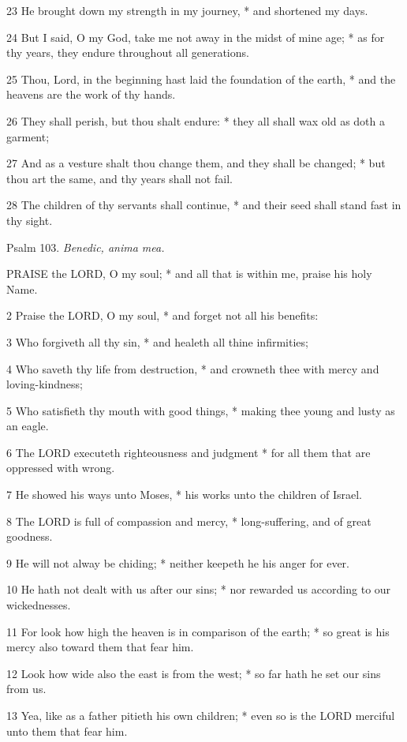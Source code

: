 23 He brought down my strength in my journey, * and
shortened my days.

24 But I said, O my God, take me not away in the midst
of mine age; * as for thy years, they endure throughout all generations.

25 Thou, Lord, in the beginning hast laid the foundation
of the earth, * and the heavens are the work of thy hands.

26 They shall perish, but thou shalt endure: * they
all shall wax old as doth a garment;

27 And as a vesture shalt thou change them, and they
shall be changed; * but thou art the same, and thy years shall not fail.

28 The children of thy servants shall continue, * and
their seed shall stand fast in thy sight.

Psalm
103. \emph{Benedic, anima mea.}

PRAISE
the LORD, O my soul; * and all that is within me, praise his holy Name.

2 Praise the LORD, O my soul, * and forget not all
his benefits:

3 Who forgiveth all thy sin, * and healeth all thine
infirmities;

4 Who saveth thy life from destruction, * and crowneth
thee with mercy and loving-kindness;

5 Who satisfieth thy mouth with good things, * making
thee young and lusty as an eagle.

6 The LORD executeth righteousness and judgment * for
all them that are oppressed with wrong.

7 He showed his ways unto Moses, * his works unto the
children of Israel.

8 The LORD is full of compassion and mercy, * long-suffering,
and of great goodness.

9 He will not alway be chiding; * neither keepeth he
his anger for ever.

10 He hath not dealt with us after our sins; * nor
rewarded us according to our wickednesses.

11 For look how high the heaven is in comparison of
the earth; * so great is his mercy also toward them that fear him.

12 Look how wide also the east is from the west; *
so far hath he set our sins from us.

13 Yea, like as a father pitieth his own children;
* even so is the LORD merciful unto them that fear him.

